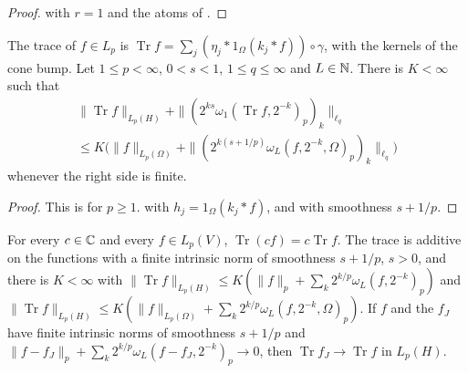 \begin{proof}
\leanok
{} with $r = 1$ and the atoms of .
\end{proof}

\begin{theorem}
\label{thm:trace-graph}
\leanok
{}
The trace of $f \in L_p$ is
$\operatorname{Tr} f = \sum_j (\eta_j * 1_\Omega (k_j * f)) \circ \gamma$, with the kernels of the
cone bump. Let $1 \leq p < \infty$, $0 < s < 1$, $1 \leq q \leq \infty$ and $L \in \mathbb{N}$. There is
$K < \infty$ such that
\begin{multline*}
  \|\operatorname{Tr} f\|_{L_p(H)} + \|(2^{ks} \omega_1(\operatorname{Tr} f, 2^{-k})_p)_k\|_{\ell_q}
  \\ \leq K \bigl( \|f\|_{L_p(\Omega)} +
    \|(2^{k(s + 1/p)} \omega_L(f, 2^{-k}, \Omega)_p)_k\|_{\ell_q} \bigr)
\end{multline*}
whenever the right side is finite.
\end{theorem}

\begin{proof}
\leanok
This is \cite[Theorem 4.2]{SchneiderVybiral} for $p \geq 1$.  with
$h_j = 1_\Omega (k_j * f)$, and  with smoothness $s + 1/p$.
\end{proof}

\begin{lemma}
\label{lem:trace-linear}
\leanok
{}
For every $c \in \mathbb{C}$ and every $f \in L_p(V)$, $\operatorname{Tr}(c f) = c \operatorname{Tr} f$.
The trace is additive on the functions with a finite intrinsic norm of smoothness $s + 1/p$,
$s > 0$, and there is $K < \infty$ with
$\|\operatorname{Tr} f\|_{L_p(H)} \leq K (\|f\|_p + \sum_k 2^{k/p} \omega_L(f, 2^{-k})_p)$ and
$\|\operatorname{Tr} f\|_{L_p(H)} \leq
K (\|f\|_{L_p(\Omega)} + \sum_k 2^{k/p} \omega_L(f, 2^{-k}, \Omega)_p)$.
If $f$ and the $f_J$ have finite intrinsic norms of smoothness $s + 1/p$ and
$\|f - f_J\|_p + \sum_k 2^{k/p} \omega_L(f - f_J, 2^{-k})_p \to 0$, then
$\operatorname{Tr} f_J \to \operatorname{Tr} f$ in $L_p(H)$.
\end{lemma}

